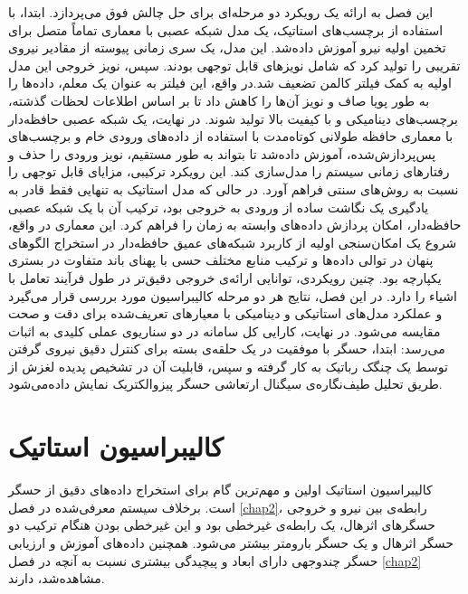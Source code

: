 این فصل به ارائه یک رویکرد دو مرحله‌ای برای حل چالش فوق می‌پردازد. ابتدا، با استفاده از برچسب‌های استاتیک، یک مدل شبکه عصبی با معماری تماماً متصل برای تخمین اولیه نیرو آموزش داده‌شد. این مدل، یک سری زمانی پیوسته از مقادیر نیروی تقریبی را تولید کرد که شامل نویزهای قابل توجهی بودند. سپس، نویز خروجی این مدل اولیه به کمک فیلتر کالمن تضعیف شد.در واقع، این فیلتر به عنوان یک معلم، داده‌ها را به طور پویا صاف و نویز آن‌ها را کاهش داد تا بر اساس اطلاعات لحظات گذشته، برچسب‌های دینامیکی و با کیفیت بالا تولید شوند. در نهایت، یک شبکه عصبی حافظه‌دار با معماری حافظه طولانی کوتاه‌مدت با استفاده از داده‌های ورودی خام و برچسب‌های پس‌پردازش‌شده، آموزش داده‌شد تا بتواند به طور مستقیم، نویز ورودی را حذف و رفتارهای زمانی سیستم را مدل‌سازی کند.
این رویکرد ترکیبی، مزایای قابل توجهی را نسبت به روش‌های سنتی فراهم ‌آورد. در حالی که مدل استاتیک به تنهایی فقط قادر به یادگیری یک نگاشت ساده از ورودی به خروجی بود، ترکیب آن با یک شبکه عصبی حافظه‌دار، امکان پردازش داده‌های وابسته به زمان را فراهم کرد. این معماری در واقع، شروع یک امکان‌سنجی اولیه از کاربرد شبکه‌های عمیق حافظه‌دار در استخراج الگوهای پنهان در توالی داده‌ها و ترکیب منابع مختلف حسی با پهنای باند متفاوت در بستری یکپارچه بود. چنین رویکردی، توانایی ارائه‌ی خروجی دقیق‌تر در طول فرآیند تعامل با اشیاء را دارد. در این فصل، نتایج هر دو مرحله کالیبراسیون مورد بررسی قرار می‌گیرد و عملکرد مدل‌های استاتیکی و دینامیکی با معیارهای تعریف‌شده برای دقت و صحت  مقایسه می‌شود.
در نهایت، کارایی کل سامانه در دو سناریوی عملی کلیدی به اثبات می‌ر‌سد: ابتدا، حسگر با موفقیت در یک حلقه‌ی بسته برای کنترل دقیق نیروی گرفتن توسط یک چنگک رباتیک به کار گرفته‌ و سپس، قابلیت آن در تشخیص پدیده لغزش از طریق تحلیل طیف‌نگاره‌ی سیگنال ارتعاشی حسگر پیزوالکتریک نمایش داده‌می‌شود.
\section{کالیبراسیون استاتیک}
\label{sec:calib_static}
کالیبراسیون استاتیک اولین و مهم‌ترین گام برای استخراج داده‌های دقیق از حسگر است. برخلاف سیستم معرفی‌شده در فصل \ref{chap2}، رابطه‌ی بین نیرو و خروجی حسگر‌های اثر‌هال، یک رابطه‌ی غیرخطی بود و این غیرخطی‌ بودن هنگام ترکیب دو حسگر اثر‌هال و یک حسگر بارومتر بیشتر می‌شود. همچنین داده‌های آموزش و ارزیابی حسگر چندوجهی دارای ابعاد و پیچیدگی بیشتری نسبت به آنچه در فصل \ref{chap2} مشاهده‌شد، دارند. 
